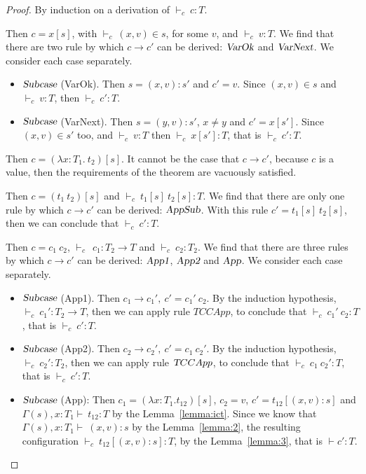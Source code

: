 \documentclass {article}
\newcommand{\tto}{\longrightarrow}
\newcommand{\absD}{\lambda x:T_1. \ t_2}
\newcommand{\conf}[2][s]{(#2)[#1]}
\newcommand{\confx}[1]{#1 [(x,v):s]}
\newcommand{\SubxD}{(x,v):s}
\newcommand{\Subx}{(x,v):s'}
\newcommand{\Suby}{(y,v):s'}
\newcommand{\envEC}{{\Gamma(s) , x:T_1 \vdash \ }}
\newcommand{\tyC}{{\vdash_c \ }}
\begin{document}
\begin{proof} By induction on a derivation of $\tyC c : T$.

\begin{case}[TCVar]
Then $c = x[s]$, with $\tyC (x,v) \in s$, for some $v$, and $\tyC v:T$. We find that there are two rule by which $c \tto c'$ can be derived: $\textsl {VarOk}$ and $\textsl {VarNext}$. We consider each case separately.
\begin{itemize}
\item $\textsl{Subcase}$ (VarOk). Then $s = \Subx$ and $c' = v$. Since $(x,v) \in s$ and $\tyC v:T$, then $\tyC c' : T$.

\item $\textsl{Subcase}$ (VarNext). Then $s = \Suby$, $x \neq y$ and $c' = x[s']$. Since $(x,v) \in s'$ too, and $\tyC v:T$ then $\tyC x[s']:T $, that is $\tyC c' : T$. 
\end{itemize}
\end{case}

\begin{case} [TAbs]
Then $c = \conf{\absD}$. It cannot be the case that $c \tto c'$, because $c$ is a value, then the requirements of the theorem are vacuously satisfied. 
\end{case}

\begin{case}[TCApp]
Then $c = \conf{t_1 \ t_2}$ and $\tyC t_1[s] \ t_2[s]: T$. We find that there are only one rule by which $c \tto c'$ can be derived: $\textsl {AppSub}$. With this rule $c' = t_1[s] \ t_2[s]$, then we can conclude that $\tyC c' : T$. 
\end{case}

\begin{case} [TCCApp]
Then $c = c_1 \ c_2$, $\tyC \ c_1 : T_2 \to T$ and $\tyC c_2 : T_2$. We find that there are three rules by which $c \tto c'$ can be derived: $\textsl {App1}$, $\textsl {App2}$ and $\textsl {App}$. We consider each case separately.
\begin{itemize}

\item $\textsl{Subcase}$ (App1). Then $c_1 \tto c_1', \ c' = c_1' \ c_2$. By the induction hypothesis, $\tyC c_1' : T_2 \to T$, then we can apply rule $TCCApp$, to conclude that $\tyC c_1' \ c_2: T$ , that is $\tyC c' : T$.

\item $\textsl{Subcase}$ (App2). Then $c_2 \tto c_2', \ c' = c_1 \ c_2'$. By the induction hypothesis, $\tyC c_2' : T_2 $, then we can apply rule $\textsl TCCApp$, to conclude that $\tyC c_1 \ c_2' : T$, that is $\tyC c' : T$.

\item $\textsl{Subcase}$ (App): Then $c_1 = \conf{\lambda x:T_{1}.t_{12}}$, $c_2 = v$, $c' = \confx{t_{12}}$ and $\envEC t_{12}: T$ by the Lemma~\ref{lemma:ict}. Since we know that $\envEC \SubxD$ by the Lemma~\ref{lemma:2}, the resulting configuration $\tyC \confx{t_{12}}:T$, by the Lemma~\ref{lemma:3}, that is $\vdash c' : T$.
\end{itemize}
\end{case}
\end{proof}
\end{document}
